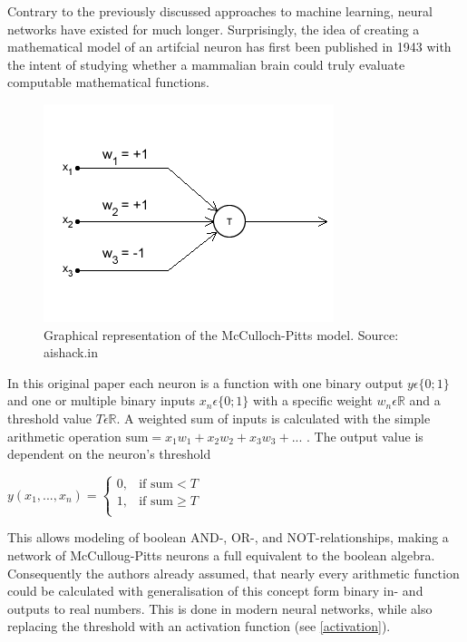 Contrary to the previously discussed approaches to machine learning, neural networks have existed for much longer. Surprisingly, the idea of creating a mathematical model of an artifcial neuron has first been published in 1943 \cite{McCulloch1943} with the intent of studying whether a mammalian brain could truly evaluate computable mathematical functions.


\begin{figure}[h]
    \centering
	\includegraphics[width=.6\textwidth]{./images/illustrations/mcculloch-pitts}
    \caption{Graphical representation of the McCulloch-Pitts model. Source: aishack.in}
    \label{fig:mcculloch-pitts}
\end{figure}


In this original paper each neuron is a function with one binary output $y \epsilon \{0;1\}$ and one or multiple binary inputs $x_n \epsilon \{0;1\}$ with a specific weight $w_n \epsilon \mathbb{R}$ and a threshold value $T \epsilon \mathbb{R}$. A weighted sum of inputs is calculated with the simple arithmetic operation $\text{sum} = x_1w_1 + x_2w_2 + x_3w_3 + ...$ . The output value is dependent on the neuron's threshold

{\centering
	$y(x_1, ..., x_n) = \begin{cases}
    0,& \text{if } \text{sum} < T\\
    1,& \text{if } \text{sum} \geq T\\
	\end{cases}$
	\par
}

This allows modeling of boolean AND-, OR-, and NOT-relationships, making a network of McCulloug-Pitts neurons a full equivalent to the boolean algebra. Consequently the authors already assumed, that nearly every arithmetic function could be calculated with generalisation of this concept form binary in- and outputs to real numbers. This is done in modern neural networks, while also replacing the threshold with an activation function (see \ref{activation}).


